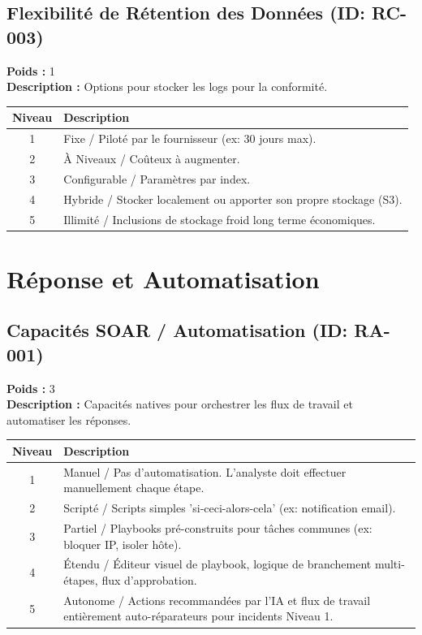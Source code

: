 \documentclass{article}
\begin{document}
\subsection{Flexibilité de Rétention des Données (ID: RC-003)}
\textbf{Poids :} 1 \\
\textbf{Description :} Options pour stocker les logs pour la conformité.
\vspace{0.3cm}
\begin{longtable}{|c|p{12cm}|}
\hline
\rowcolor{lightgray} \textbf{Niveau} & \textbf{Description} \\ \hline
1 & Fixe / Piloté par le fournisseur (ex: 30 jours max). \\ \hline
2 & À Niveaux / Coûteux à augmenter. \\ \hline
3 & Configurable / Paramètres par index. \\ \hline
4 & Hybride / Stocker localement ou apporter son propre stockage (S3). \\ \hline
5 & Illimité / Inclusions de stockage froid long terme économiques. \\ \hline
\end{longtable}
\vspace{0.5cm}
\section{Réponse et Automatisation}
\subsection{Capacités SOAR / Automatisation (ID: RA-001)}
\textbf{Poids :} 3 \\
\textbf{Description :} Capacités natives pour orchestrer les flux de travail et automatiser les réponses.
\vspace{0.3cm}
\begin{longtable}{|c|p{12cm}|}
\hline
\rowcolor{lightgray} \textbf{Niveau} & \textbf{Description} \\ \hline
1 & Manuel / Pas d'automatisation. L'analyste doit effectuer manuellement chaque étape. \\ \hline
2 & Scripté / Scripts simples 'si-ceci-alors-cela' (ex: notification email). \\ \hline
3 & Partiel / Playbooks pré-construits pour tâches communes (ex: bloquer IP, isoler hôte). \\ \hline
4 & Étendu / Éditeur visuel de playbook, logique de branchement multi-étapes, flux d'approbation. \\ \hline
5 & Autonome / Actions recommandées par l'IA et flux de travail entièrement auto-réparateurs pour incidents Niveau 1. \\ \hline
\end{longtable}
\vspace{0.5cm}
\end{document}
